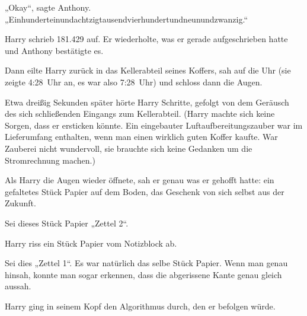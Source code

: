 „Okay“, sagte Anthony. „Einhunderteinundachtzigtausendvierhundertundneunundzwanzig.“

Harry schrieb 181.429 auf. Er wiederholte, was er gerade aufgeschrieben hatte und Anthony bestätigte es.

Dann eilte Harry zurück in das Kellerabteil seines Koffers, sah auf die Uhr (sie zeigte 4:28~Uhr an, es war also 7:28~Uhr) und schloss dann die Augen.

Etwa dreißig Sekunden später hörte Harry Schritte, gefolgt von dem Geräusch des sich schließenden Eingangs zum Kellerabteil. (Harry machte sich keine Sorgen, dass er ersticken könnte. Ein eingebauter Luftaufbereitungszauber war im Lieferumfang enthalten, wenn man einen wirklich guten Koffer kaufte. War Zauberei nicht wundervoll, sie brauchte sich keine Gedanken um die Stromrechnung machen.)

Als Harry die Augen wieder öffnete, sah er genau was er gehofft hatte: ein gefaltetes Stück Papier auf dem Boden, das Geschenk von sich selbst aus der Zukunft.

Sei dieses Stück Papier „Zettel 2“.

Harry riss ein Stück Papier vom Notizblock ab.

Sei dies „Zettel 1“. Es war natürlich das selbe Stück Papier. Wenn man genau hinsah, konnte man sogar erkennen, dass die abgerissene Kante genau gleich aussah.

Harry ging in seinem Kopf den Algorithmus durch, den er befolgen würde.

